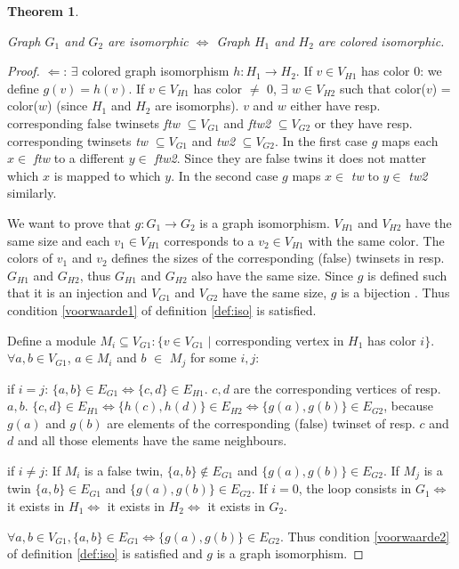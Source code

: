 \documentclass[twoside]{article}
\theoremstyle{definition}
\theoremstyle{plain}
\newtheorem{theorem}{Theorem}
\begin{document}
\begin{multicols}{2}
\begin{theorem}
\begin{compactenum}[\upshape(a)]
\end{compactenum}
Graph $G_1$ and $G_2$ are isomorphic $\iff$ Graph $H_1$ and $H_2$ are colored isomorphic.
\end{theorem}
\begin{proof}


$\Leftarrow$:  $\exists$ colored graph isomorphism $h: H_1 \to H_2$. If $v \in V_{H1}$ has color 0: we define $g(v) = h(v)$.
If $v \in V_{H1}$ has color $\neq$ 0, $\exists$ $ w \in V_{H2}$ such that color($v$) = color($w$) (since $H_1$ and $H_2$ are isomorphs). $v$ and $w$ either have resp. corresponding false twinsets \emph{ftw} $\subseteq V_{G1}$ and \emph{ftw2} $\subseteq V_{G2}$ or they have resp. corresponding twinsets \emph{tw} $\subseteq V_{G1}$ and \emph{tw2} $\subseteq V_{G2}$. In the first case $g$ maps each $x \in$ \emph{ftw} to a different $y \in$ \emph{ftw2}. Since they are false twins it does not matter which $x$ is mapped to which $y$. In the second case $g$ maps $x \in$ \emph{tw} to $y \in$ \emph{tw2} similarly. 

We want to prove that $g: G_1 \to G_2$ is a graph isomorphism. $V_{H1}$ and $V_{H2}$ have the same size and each $v_1 \in V_{H1}$ corresponds to a $v_2 \in V_{H1}$ with the same color. The colors of $v_1$ and $v_2$ defines the sizes of the corresponding (false) twinsets in resp. $G_{H1}$ and $G_{H2}$, thus $G_{H1}$ and $G_{H2}$ also have the same size. Since $g$ is defined such that it is an injection and $V_{G1}$ and $V_{G2}$ have the same size, $g$ is a bijection \cite{website:proofwiki}. Thus condition \ref{voorwaarde1} of definition \ref{def:iso} is satisfied. 

Define a module $M_i \subseteq V_{G1}: \{v \in V_{G1}$ $|$ corresponding vertex in $H_1$ has color $i \}$. $\forall a, b \in V_{G1}$, $a \in M_i$ and $b$ $\in$ $M_j$ for some $i,j$: 
\begin{compactenum}
\item if $i = j$: $\{a,b\} \in E_{G1} \iff \{c,d\} \in E_{H1}$. $c,d$ are the corresponding vertices of resp. $a,b$. $\{c,d\} \in E_{H1} \iff \{h(c),h(d)\} \in E_{H2} \iff \{g(a),g(b)\} \in E_{G2}$, because $g(a)$ and $g(b)$ are elements of the corresponding (false) twinset of resp. $c$ and $d$ and all those elements have the same neighbours. 
\item if $i \neq j$: If $M_i$ is a false twin, $\{a,b\} \notin E_{G1} $ and $\{g(a),g(b)\} \in E_{G2}$. If $M_j$ is a twin $\{a,b\} \in E_{G1} $ and $\{g(a),g(b)\}\in E_{G2}$. If $i = 0$, the loop consists in $G_1 \iff$ it exists in $H_1 \iff$ it exists in $H_2 \iff$ it exists in $G_2$.
\end{compactenum} 
$\forall a, b \in V_{G1}, \{a, b\} \in E_{G1} \iff \{g(a), g(b)\} \in E_{G2}$.
Thus condition \ref{voorwaarde2} of definition \ref{def:iso} is satisfied and $g$ is a graph isomorphism. 



\end{proof}
\end{multicols}
\end{document}
